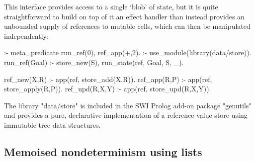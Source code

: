 This interface provides access to a single `blob' of state, but it is quite 
straightforward to build on top of it an effect handler than instead provides an 
unbounded supply of references to mutable cells, which can then be manipulated independently:
\begin{prolog-framed}[name=ccstate]
	:- meta_predicate run_ref(0), ref_app(+,2).
	:- use_module(library(data/store)).
	run_ref(Goal) :- store_new(S), run_state(ref, Goal, S, _).

	ref_new(X,R)   :- app(ref, store_add(X,R)).
	ref_app(R,P)   :- app(ref, store_apply(R,P)).
	ref_upd(R,X,Y) :- app(ref, store_upd(R,X,Y)).
\end{prolog-framed}
The library "data/store" is included in the SWI Prolog add-on package "genutils"
and provides a pure, declarative implementation of a reference-value store using 
immutable tree data structures.

\subsection{Memoised nondeterminism using lists}
\label{sec:ccmemo}

